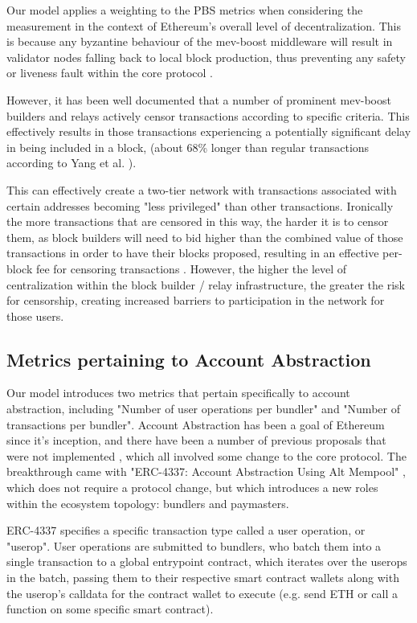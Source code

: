 \documentclass[conference]{IEEEtran}
\begin{document}
Our model applies a weighting to the PBS metrics when considering the measurement in the context of Ethereum's overall level of decentralization.  This is because any byzantine behaviour of the mev-boost middleware will result in validator nodes falling back to local block production, thus preventing any safety or liveness fault within the core protocol \cite{hasu2022}.

However, it has been well documented \cite{labrys2022} that a number of prominent mev-boost builders and relays actively censor transactions according to specific criteria.  This effectively results in those transactions experiencing a potentially significant delay in being included in a block, (about 68\% longer than regular transactions according to Yang et al. \cite{yang2022sok}). 

This can effectively create a two-tier network with transactions associated with certain addresses becoming "less privileged" than other transactions.  Ironically the more transactions that are censored in this way, the harder it is to censor them, as block builders will need to bid higher than the combined value of those transactions in order to have their blocks proposed, resulting in an effective per-block fee for censoring transactions \cite{buterin2022}.  However, the higher the level of centralization within the block builder / relay infrastructure, the greater the risk for censorship, creating increased barriers to participation in the network for those users.

\subsection{Metrics pertaining to Account Abstraction}

Our model introduces two metrics that pertain specifically to account abstraction, including "Number of user operations per bundler" and "Number of transactions per bundler". Account Abstraction has been a goal of Ethereum since it's inception, and there have been a number of previous proposals that were not implemented \cite{john2023, wilson2020, dietrichs2020}, which all involved some change to the core protocol.  The breakthrough came with "ERC-4337: Account Abstraction Using Alt Mempool" \cite{buterin2021B}, which does not require a protocol change, but which introduces a new roles within the ecosystem topology: bundlers and paymasters.

ERC-4337 specifies a specific transaction type called a user operation, or "userop".  User operations are submitted to bundlers, who batch them into a single transaction to a global entrypoint contract, which iterates over the userops in the batch, passing them to their respective smart contract wallets along with the userop's calldata for the contract wallet to execute (e.g. send ETH or call a function on some specific smart contract).
\end{document}
